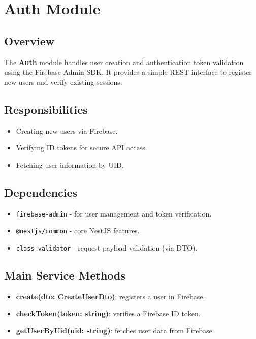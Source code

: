 \section{Auth Module}

\subsection*{Overview}

The \textbf{Auth} module handles user creation and authentication token validation using the Firebase Admin SDK. It provides a simple REST interface to register new users and verify existing sessions.

\subsection*{Responsibilities}

\begin{itemize}
    \item Creating new users via Firebase.
    \item Verifying ID tokens for secure API access.
    \item Fetching user information by UID.
\end{itemize}

\subsection*{Dependencies}

\begin{itemize}
    \item \texttt{firebase-admin} - for user management and token verification.
    \item \texttt{@nestjs/common} - core NestJS features.
    \item \texttt{class-validator} - request payload validation (via DTO).
\end{itemize}

\subsection*{Main Service Methods}

\begin{itemize}
    \item \textbf{create(dto: CreateUserDto)}: registers a user in Firebase.
    \item \textbf{checkToken(token: string)}: verifies a Firebase ID token.
    \item \textbf{getUserByUid(uid: string)}: fetches user data from Firebase.
\end{itemize}

